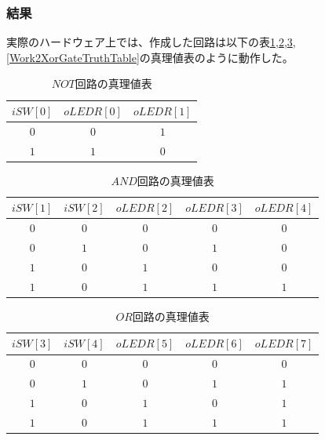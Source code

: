 \documentclass[a4paper]{jarticle}
\begin{document}
\subsubsection{結果}
実際のハードウェア上では、作成した回路は以下の表\ref{Work2NotGateTruthTable},\ref{Work2AndGateTruthTable},\ref{Work2OrGateTruthTable},\ref{Work2XorGateTruthTable}の真理値表のように動作した。
\begin{table}[!h]
	\begin{center}
		\caption{$NOT$回路の真理値表}
		\label{Work2NotGateTruthTable}
		\begin{tabular}{|c|c|c|}
			\hline
			$iSW \left[ 0 \right]$	&$oLEDR \left[ 0 \right]$	&$oLEDR \left[ 1 \right]$\\	\hline\hline
			$0$			&$0$				&$1$\\				\hline
			$1$			&$1$				&$0$\\				\hline
		\end{tabular}
	\end{center}
\end{table}
\begin{table}[!h]
	\begin{center}
		\caption{$AND$回路の真理値表}
		\label{Work2AndGateTruthTable}
		\begin{tabular}{|c|c|c|c|c|}
			\hline
			$iSW \left[ 1 \right]$	&$iSW \left[ 2 \right]$	&$oLEDR \left[ 2 \right]$	&$oLEDR \left[ 3 \right]$	&$oLEDR \left[ 4 \right]$\\	\hline\hline
			$0$			&$0$			&$0$				&$0$				&$0$\\				\hline
			$0$			&$1$			&$0$				&$1$				&$0$\\				\hline
			$1$			&$0$			&$1$				&$0$				&$0$\\				\hline
			$1$			&$0$			&$1$				&$1$				&$1$\\				\hline
		\end{tabular}
	\end{center}
\end{table}
\begin{table}[!h]
	\begin{center}
		\caption{$OR$回路の真理値表}
		\label{Work2OrGateTruthTable}
		\begin{tabular}{|c|c|c|c|c|}
			\hline
			$iSW \left[ 3 \right]$	&$iSW \left[ 4 \right]$	&$oLEDR \left[ 5 \right]$	&$oLEDR \left[ 6 \right]$	&$oLEDR \left[ 7 \right]$\\	\hline\hline
			$0$			&$0$			&$0$				&$0$				&$0$\\				\hline
			$0$			&$1$			&$0$				&$1$				&$1$\\				\hline
			$1$			&$0$			&$1$				&$0$				&$1$\\				\hline
			$1$			&$0$			&$1$				&$1$				&$1$\\				\hline
		\end{tabular}
	\end{center}
\end{table}
\end{document}
